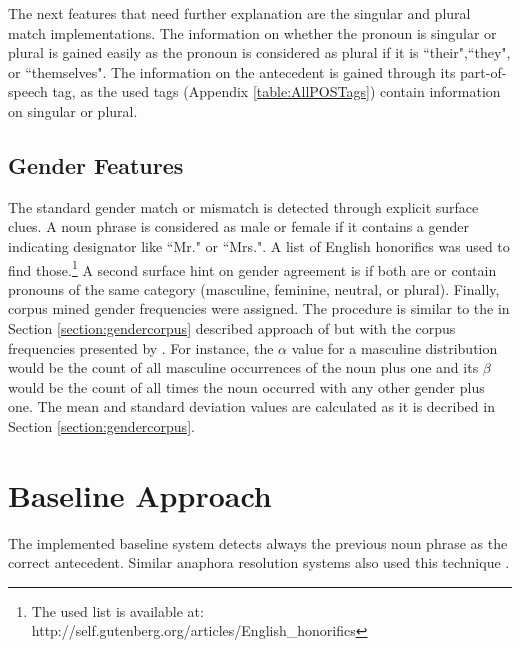 The next features that need further explanation are the singular and plural match implementations. The information on whether the pronoun is singular or plural is gained easily as the pronoun is considered as plural if it is ``their",``they", or ``themselves". The information on the antecedent is gained through its part-of-speech tag, as the used tags (Appendix \ref{table:AllPOSTags}) contain information on singular or plural.

\subsection{Gender Features}
The standard gender match or mismatch is detected through explicit surface clues. A noun phrase is considered as male or female if it contains a gender indicating designator like ``Mr." or ``Mrs.". A list of English honorifics was used to find those.\footnote{The used list is available at: http://self.gutenberg.org/articles/English\_honorifics} A second surface hint on gender agreement is if both are or contain pronouns of the same category (masculine, feminine, neutral, or plural).
Finally, corpus mined gender frequencies were assigned. The procedure is similar to the in Section \ref{section:gendercorpus} described approach of \cite{bergsma2005automatic} but with the corpus frequencies presented by \cite{Bergsma:06}. For instance, the $\alpha$ value for a masculine distribution would be the count of all masculine occurrences of the noun plus one and its $\beta$ would be the count of all times the noun occurred with any other gender plus one. The mean and standard deviation values are calculated as it is decribed in Section \ref{section:gendercorpus}.

\section{Baseline Approach}
The implemented baseline system detects always the previous noun phrase as the correct antecedent. Similar anaphora resolution systems also used this technique \citep{poesio2004general,bergsma2005automatic}.

